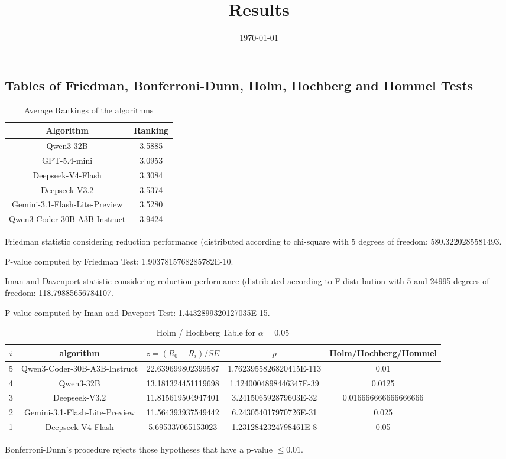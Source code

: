 \documentclass[a4paper,10pt]{article}
\title{Results}
\date{\today}
\begin{document}
\begin{landscape}
\oddsidemargin 0in \topmargin 0in\maketitle
\section{Tables of Friedman, Bonferroni-Dunn, Holm, Hochberg and Hommel Tests}
\begin{table}[!htp]
\centering
\caption{Average Rankings of the algorithms
}\begin{tabular}{c|c}
Algorithm&Ranking\\
\hline
Qwen3-32B&3.5885\\
GPT-5.4-mini&3.0953\\
Deepseek-V4-Flash&3.3084\\
Deepseek-V3.2&3.5374\\
Gemini-3.1-Flash-Lite-Preview&3.5280\\
Qwen3-Coder-30B-A3B-Instruct&3.9424\\
\end{tabular}
\end{table}


Friedman statistic considering reduction performance (distributed according to chi-square with 5 degrees of freedom: 580.3220285581493.


P-value computed by Friedman Test: 1.9037815768285782E-10.\newline

Iman and Davenport statistic considering reduction performance (distributed according to F-distribution with 5 and 24995 degrees of freedom: 118.79885656784107.


P-value computed by Iman and Daveport Test: 1.4432899320127035E-15.\newline

\begin{table}[!htp]
\centering\tiny
\caption{Holm / Hochberg Table for $\alpha=0.05$}
\begin{tabular}{ccccc}
$i$&algorithm&$z=(R_0 - R_i)/SE$&$p$&Holm/Hochberg/Hommel\\
\hline
5&Qwen3-Coder-30B-A3B-Instruct&22.639699802399587&1.7623955826820415E-113&0.01\\
4&Qwen3-32B&13.181324451119698&1.1240004898446347E-39&0.0125\\
3&Deepseek-V3.2&11.815619504947401&3.241506592879603E-32&0.016666666666666666\\
2&Gemini-3.1-Flash-Lite-Preview&11.564393937549442&6.243054017970726E-31&0.025\\
1&Deepseek-V4-Flash&5.695337065153023&1.2312842324798461E-8&0.05\\
\hline
\end{tabular}
\end{table}
Bonferroni-Dunn's procedure rejects those hypotheses that have a p-value $\le0.01$.



\end{landscape}
\end{document}
